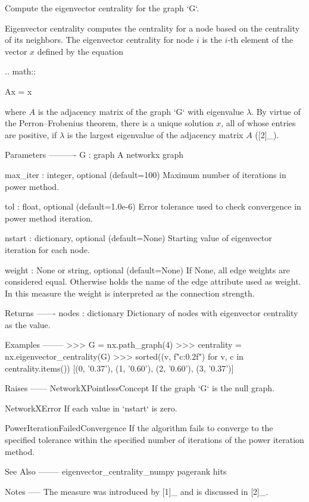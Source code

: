 \begin{DoxyVerb}Compute the eigenvector centrality for the graph `G`.

Eigenvector centrality computes the centrality for a node based on the
centrality of its neighbors. The eigenvector centrality for node $i$ is
the $i$-th element of the vector $x$ defined by the equation

.. math::

    Ax = \lambda x

where $A$ is the adjacency matrix of the graph `G` with eigenvalue
$\lambda$. By virtue of the Perron–Frobenius theorem, there is a unique
solution $x$, all of whose entries are positive, if $\lambda$ is the
largest eigenvalue of the adjacency matrix $A$ ([2]_).

Parameters
----------
G : graph
  A networkx graph

max_iter : integer, optional (default=100)
  Maximum number of iterations in power method.

tol : float, optional (default=1.0e-6)
  Error tolerance used to check convergence in power method iteration.

nstart : dictionary, optional (default=None)
  Starting value of eigenvector iteration for each node.

weight : None or string, optional (default=None)
  If None, all edge weights are considered equal.
  Otherwise holds the name of the edge attribute used as weight.
  In this measure the weight is interpreted as the connection strength.

Returns
-------
nodes : dictionary
   Dictionary of nodes with eigenvector centrality as the value.

Examples
--------
>>> G = nx.path_graph(4)
>>> centrality = nx.eigenvector_centrality(G)
>>> sorted((v, f"{c:0.2f}") for v, c in centrality.items())
[(0, '0.37'), (1, '0.60'), (2, '0.60'), (3, '0.37')]

Raises
------
NetworkXPointlessConcept
    If the graph `G` is the null graph.

NetworkXError
    If each value in `nstart` is zero.

PowerIterationFailedConvergence
    If the algorithm fails to converge to the specified tolerance
    within the specified number of iterations of the power iteration
    method.

See Also
--------
eigenvector_centrality_numpy
pagerank
hits

Notes
-----
The measure was introduced by [1]_ and is discussed in [2]_.


\end{DoxyVerb}
